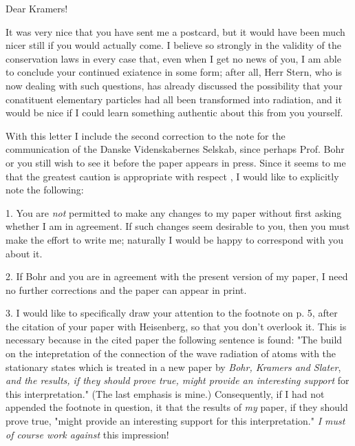 \date{July 27, 1925}

Dear Kramers!

It was very nice that you have sent me a postcard, but it would have been much nicer still if you would actually come. I believe so strongly in the validity of the conservation laws in every case that, even when I get no news of you, I am able to conclude your continued exiatence in some form; after all, Herr Stern, who is now dealing with such questions, has already discussed the possibility that your conatituent elementary particles had all been transformed into radiation, and it would be nice if I could learn something authentic about this from you yourself.

With this letter I include the second correction to the note for the communication of the Danske Videnskabernes Selskab, since perhaps Prof. Bohr or you still wish to see it before the paper appears in press. Since it seems to me that the greatest caution is appropriate with respect , I would like to explicitly note the following:

1. You are \textit{not} permitted to make any changes to my paper without first asking whether I am in agreement. If such changes seem desirable to you, then you must make the effort to write me; naturally I would be happy to correspond with you about it.

2. If Bohr and you are in agreement with the present version of my paper, I need no further corrections and the paper can appear in print.

3. I would like to specifically draw your attention to the footnote on p. 5, after the citation of your paper with Heisenberg, so that you don't overlook it. This is necessary because in the cited paper the following sentence is found: "The  build on the intepretation of the connection of the wave radiation of atoms with the stationary states which is treated in a new paper by \textit{Bohr, Kramers and Slater}, \textit{and the results, if they should prove true, might provide an interesting support} for this interpretation." (The last emphasis is mine.) Consequently, if I had not appended the footnote in question, it  that the results of \textit{my} paper, if they should prove true, "might provide an interesting support for this interpretation." \textit{I must of course work against} this impression!

